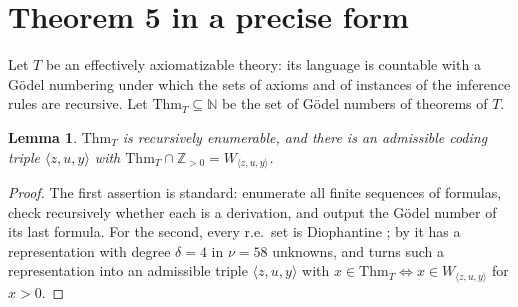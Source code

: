 \documentclass[11pt,letterpaper]{article}
\newtheorem{lemma}[theorem]{Lemma}
\theoremstyle{definition}
\theoremstyle{remark}
\numberwithin{equation}{section}
\begin{document}
\section{Theorem 5 in a precise form}\label{sec:thm5}

Let $T$ be an effectively axiomatizable theory: its language is countable
with a G\"odel numbering under which the sets of axioms and of instances of
the inference rules are recursive. Let $\mathrm{Thm}_T\subseteq\mathbb N$ be
the set of G\"odel numbers of theorems of $T$.

\begin{lemma}\label{lem:re}
$\mathrm{Thm}_T$ is recursively enumerable, and there is an admissible
coding triple $\langle z,u,y\rangle$ with
$\mathrm{Thm}_T\cap\mathbb Z_{>0}=W_{\langle z,u,y\rangle}$.
\end{lemma}

\begin{proof}
The first assertion is standard: enumerate all finite sequences of formulas,
check recursively whether each is a derivation, and output the G\"odel
number of its last formula. For the second, every r.e.\ set is Diophantine
\cite{DPR,Mat70}; by \cite[\S5]{J82} it has a representation with degree
$\delta=4$ in $\nu=58$ unknowns, and \cite[(4.1)]{J82} turns such a
representation into an admissible triple $\langle z,u,y\rangle$ with
$x\in\mathrm{Thm}_T\Leftrightarrow x\in W_{\langle z,u,y\rangle}$ for $x>0$.
\end{proof}
\end{document}

